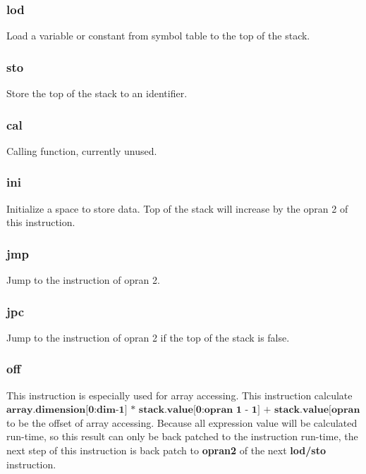 \documentclass{article}
\begin{document}
		\subsubsection{lod}
		Load a variable or constant from symbol table to the top of the stack.
		\subsubsection{sto}
		Store the top of the stack to an identifier.
		\subsubsection{cal}
		Calling function, currently unused.
		\subsubsection{ini}
		Initialize a space to store data. Top of the stack will increase by the opran 2 of this instruction.
		\subsubsection{jmp}
		Jump to the instruction of opran 2.
		\subsubsection{jpc}
		Jump to the instruction of opran 2 if the top of the stack is false.
		\subsubsection{off}
		This instruction is especially used for array accessing. This instruction calculate \\ $ \textbf{array.dimension[0:dim-1] * stack.value[0:opran 1 - 1] + stack.value[opran 1]} $ to be the offset of array accessing. Because all expression value will be calculated run-time, so this result can only be back patched to the instruction run-time, the next step of this instruction is back patch to \textbf{opran2} of the next \textbf{lod/sto} instruction.
\end{document}
